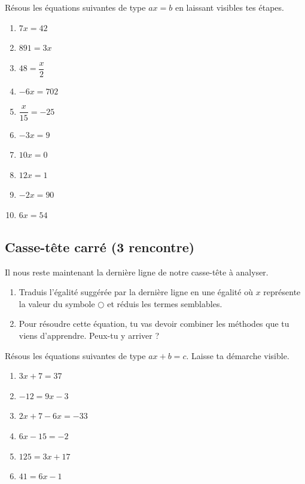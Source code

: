 \documentclass[../../syllabus_2.tex]{subfiles}
\begin{document}
\begin{exercise}
  Résous les équations suivantes de type $ax = b$ en laissant visibles
  tes étapes.
  \begin{enumerate}[cols=2, itemsep=2.7cm]
    \item $7x = 42$
    \item $891 = 3x$
    \item $48 = \dfrac{x}{2}$
    \item $- 6x = 702$
    \item $\dfrac{x}{15} = -25$
    \item $- 3x = 9$
    \item $10x = 0$
    \item $12x = 1$
    \item $-2x=90$
    \item $6x=54$
  \end{enumerate}
  \vspace*{3cm}
\end{exercise}

\subsection{Casse-tête carré (3\ieme{} rencontre)}

Il nous reste maintenant la dernière ligne de notre casse-tête à
analyser.
\begin{center}
  
\end{center}

\begin{enumerate}
  \item
        Traduis l'égalité suggérée par la dernière ligne en une égalité où
        $x$ représente la valeur du symbole $\bigcirc$ et réduis les termes semblables. \vspace*{2cm}
  \item Pour résoudre cette équation, tu vas devoir combiner les méthodes que tu viens d'apprendre. Peux-tu y arriver ?
        \vspace*{2cm}
\end{enumerate}%

\begin{exercise}
  Résous les équations suivantes de type $ax + b = c$. Laisse ta
  démarche visible.
  \begin{enumerate}[cols=2, itemsep=2.7cm]
    \item $3x + 7 = 37$
    \item $- 12 = 9x - 3$
    \item $2x + 7 - 6x = - 33$
    \item $6x - 15 = - 2$
    \item $125 = 3x + 17$
    \item $41 = 6x - 1$
  \end{enumerate}
\end{exercise}
\end{document}
